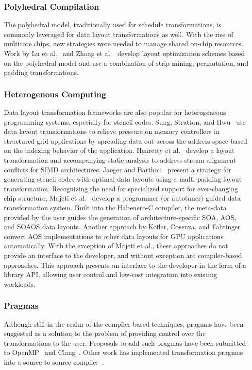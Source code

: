 \subsubsection{Polyhedral Compilation}
The polyhedral model, traditionally used for schedule transformations, is commonly leveraged for data layout transformations as well.
With the rise of multicore chips, new strategies were needed to manage shared on-chip resources. 
Work by Lu et al.~\cite{lu2009data} and Zhang et al.~\cite{zhang2011optimizing} develop layout optimization schemes based on the polyhedral model and use a combination of strip-mining, permutation, and padding transformations.

\subsubsection{Heterogenous Computing}
Data layout transformation frameworks are also popular for heterogeneous programming systems, especially for stencil codes.
Sung, Stratton, and Hwu~\cite{sung2010data} use data layout transformations to relieve pressure on memory controllers in structured grid applications by spreading data out across the address space based on the indexing behavior of the application.
Henretty et al.~\cite{henretty2011data} develop a layout transformation and accompanying static analysis to address stream alignment conflicts for SIMD architectures.
Jaeger and Barthou~\cite{jaeger2012automatic} present a strategy for generating stencil codes with optimal data layouts using a multi-padding layout transformation.
Recognizing the need for specialized support for ever-changing chip structure, Majeti et al.~\cite{majeti2013compiler} develop a programmer (or autotuner) guided data transformation system.
Built into the Habenero-C compiler, the meta-data provided by the user guides the generation of architecture-specific SOA, AOS, and SOAOS data layouts.
Another approach by Kofler, Cosenza, and Fahringer~\cite{kofler2015automatic} convert AOS implementations to other data layouts for GPU applications automatically.  
With the exception of Majeti et al., these approaches do not provide an interface to the developer, and without exception are compiler-based approaches.
This approach presents an interface to the developer in the form of a library API, allowing user control and low-cost integration into existing workloads.

\subsubsection{Pragmas}
Although still in the realm of the compiler-based techniques, pragmas have been suggested as a solution to the problem of providing control over the transformations to the user.
Proposals to add such pragmas have been submitted to OpenMP~\cite{kruse2019design} and Clang~\cite{kruse2018user}.
Other work has implemented transformation pragmas into a source-to-source compiler~\cite{xu2014semi}. 

